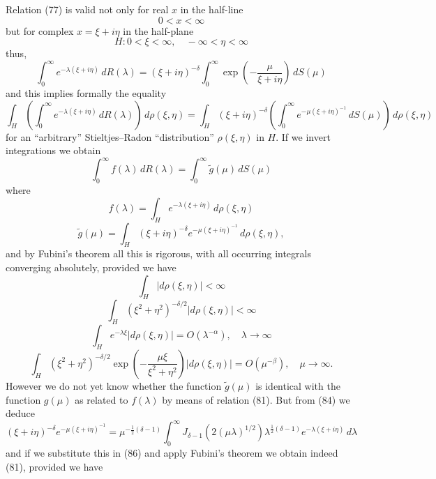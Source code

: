 \documentclass[12pt]{article}
\begin{document}
Relation (77) is valid not only for real \(x\) in the half-line
\[
0 < x < \infty
\]
but for complex \(x = \xi + i\eta\) in the half-plane
\[
H: 0 < \xi < \infty, \quad -\infty < \eta < \infty
\]
thus,
\[
\int_0^{\infty} e^{-\lambda(\xi+i\eta)} \, dR(\lambda) = (\xi + i\eta)^{-\delta} \int_0^{\infty} \exp \left( -\frac{\mu}{\xi + i\eta} \right) \, dS(\mu)
\]
and this implies formally the equality
\[
\int_H \left( \int_0^{\infty} e^{-\lambda(\xi+i\eta)} \, dR(\lambda) \right) \, d\rho(\xi, \eta) = \int_H (\xi + i\eta)^{-\delta} \left( \int_0^{\infty} e^{-\mu(\xi+i\eta)^{-1}} \, dS(\mu) \right) \, d\rho(\xi, \eta)
\]
for an ``arbitrary'' Stieltjes–Radon ``distribution'' \(\rho(\xi, \eta)\) in \(H\). If we invert integrations we obtain
\[
\int_0^{\infty} f(\lambda) \, dR(\lambda) = \int_0^{\infty} \tilde{g}(\mu) \, dS(\mu)
\]
where
\begin{equation}
f(\lambda) = \int_H e^{-\lambda(\xi+i\eta)} \, d\rho(\xi, \eta)
\tag{85}
\end{equation}
\begin{equation}
\tilde{g}(\mu) = \int_H (\xi + i\eta)^{-\delta} e^{-\mu(\xi+i\eta)^{-1}} \, d\rho(\xi, \eta),
\tag{86}
\end{equation}
and by Fubini's theorem all this is rigorous, with all occurring integrals converging absolutely, provided we have
\begin{equation}
\int_H |d\rho(\xi, \eta)| < \infty
\tag{87}
\end{equation}
\[
\int_H (\xi^2 + \eta^2)^{-\delta/2} |d\rho(\xi, \eta)| < \infty
\]
\begin{equation}
\int_H e^{-\lambda\xi} |d\rho(\xi, \eta)| = O(\lambda^{-\alpha}), \quad \lambda \to \infty
\tag{88}
\end{equation}
\begin{equation}
\int_H (\xi^2 + \eta^2)^{-\delta/2} \exp \left( -\frac{\mu\xi}{\xi^2 + \eta^2} \right) |d\rho(\xi, \eta)| = O(\mu^{-\beta}), \quad \mu \to \infty.
\tag{89}
\end{equation}
However we do not yet know whether the function \(\tilde{g}(\mu)\) is identical with the function \(g(\mu)\) as related to \(f(\lambda)\) by means of relation (81). But from (84) we deduce
\begin{equation}
(\xi + i\eta)^{-\delta} e^{-\mu(\xi+i\eta)^{-1}} = \mu^{-\frac{1}{2}(\delta-1)} \int_0^{\infty} J_{\delta-1}(2(\mu\lambda)^{1/2}) \lambda^{\frac{1}{2}(\delta-1)} e^{-\lambda(\xi+i\eta)} \, d\lambda
\tag{90}
\end{equation}
and if we substitute this in (86) and apply Fubini's theorem we obtain indeed (81), provided we have
\end{document}
